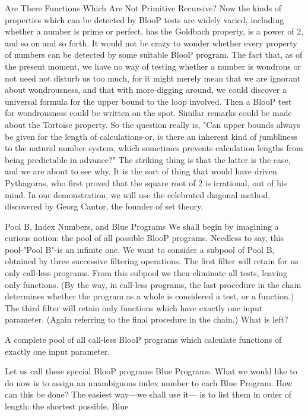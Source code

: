          Are There Functions Which Are Not Primitive Recursive?
Now the kinds of properties which can be detected by BlooP tests are widely varied,
including whether a number is prime or perfect, has the Goldbach property, is a power of
2, and so on and so forth. It would not be crazy to wonder whether every property of
numbers can be detected by some suitable BlooP program. The fact that, as of the present
moment, we have no way of testing whether a number is wondrous or not need not
disturb us too much, for it might merely mean that we are ignorant about wondrousness,
and that with more digging around, we could discover a universal formula for the upper
bound to the loop involved. Then a BlooP test for wondrousness could be written on the
spot. Similar remarks could be made about the Tortoise property.
        So the question really is, "Can upper bounds always be given for the length of
calculations-or, is there an inherent kind of jumbliness to the natural number system,
which sometimes prevents calculation lengths from being predictable in advance?" The
striking thing is that the latter is the case, and we are about to see why. It is the sort of
thing that would have driven Pythagoras, who first proved that the square root of 2 is
irrational, out of his mind. In our demonstration, we will use the celebrated diagonal
method, discovered by Georg Cantor, the founder of set theory.

                  Pool B, Index Numbers, and Blue Programs
We shall begin by imagining a curious notion: the pool of all possible BlooP programs.
Needless to say, this pool-"Pool B"-is an infinite one. We want to consider a subpool of
Pool B, obtained by three successive filtering operations. The first filter will retain for us
only call-less programs. From this subpool we then eliminate all tests, leaving only
functions. (By the way, in call-less programs, the last procedure in the chain determines
whether the program as a whole is considered a test, or a function.) The third filter will
retain only functions which have exactly one input parameter. (Again referring to the
final procedure in the chain.) What is left?

       A complete pool of all call-less BlooP programs which calculate functions of
       exactly one input parameter.

Let us call these special BlooP programs Blue Programs.
         What we would like to do now is to assign an unambiguous index
number to each Blue Program. How can this be done? The easiest way—we shall use it—
is to list them in order of length: the shortest possible. Blue




